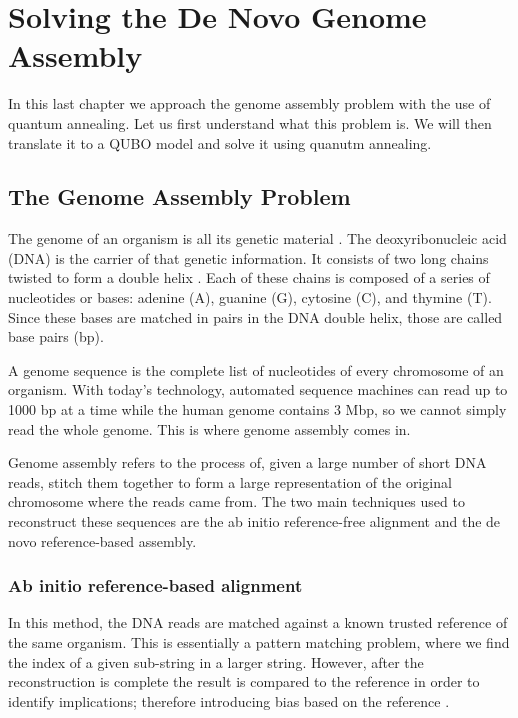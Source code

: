 \chapter{Solving the De Novo Genome Assembly}


In this last chapter we approach the genome assembly problem with the use of quantum annealing. Let us first understand what this problem is. We will then translate it to a QUBO model and solve it using quanutm annealing.


\section{The Genome Assembly Problem}


The genome of an organism is all its genetic material \cite{Roth2019}. The deoxyribonucleic acid (DNA) is the carrier of that genetic information. It consists of two long chains twisted to form a double helix \cite{Alberts2007}. Each of these chains is composed of a series of nucleotides or bases: adenine (A), guanine (G), cytosine (C), and thymine (T). Since these bases are matched in pairs in the DNA double helix, those are called base pairs (bp).

A genome sequence is the complete list of nucleotides of every chromosome of an organism. With today's technology, automated sequence machines can read up to 1000 bp at a time \cite{Slatko2011} while the human genome contains 3 Mbp, so we cannot simply read the whole genome. This is where genome assembly comes in.

Genome assembly refers to the process of, given a large number of short DNA reads, stitch them together to form a large representation of the original chromosome where the reads came from. The two main techniques used to reconstruct these sequences are the ab initio reference-free alignment and the de novo reference-based assembly.


\subsection{Ab initio reference-based alignment}


In this method, the DNA reads are matched against a known trusted reference of the same organism. This is essentially a pattern matching problem, where we find the index of a given sub-string in a larger string. However, after the reconstruction is complete the result is compared to the reference in order to identify implications; therefore introducing bias based on the reference \cite{Sarkar2020}.

